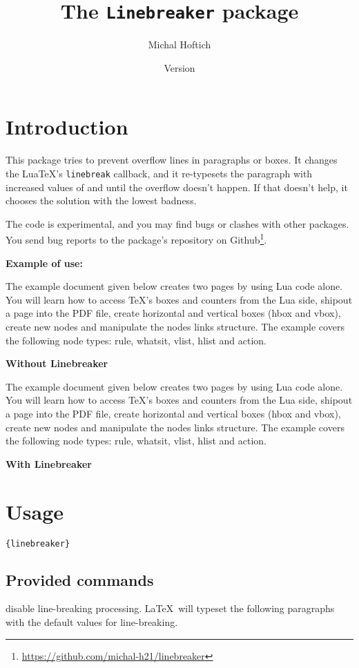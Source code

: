 \documentclass{l3doc}
\title{The \texttt{Linebreaker} package}
\author{Michal Hoftich\authormail{michal.h21@gmail.com}}
\date{Version \version\\\gitdate}
\newcommand\testbox[1]{%
  \parbox{150pt}{%
    \parindent=15pt%
    \tolerance=1%
    \pretolerance=1%
    #1
  }%
}
\newcommand\printtest[1]{%
  \linebreakerdisable%
  \noindent\testbox{%
    #1
    \par\medskip\noindent \textbf{Without Linebreaker}
  }%
  \linebreakerenable%
  \hfill%
  \testbox{%
    #1
    \par\medskip\noindent \textbf{With Linebreaker}
  }%
}
\begin{document}
\maketitle
\tableofcontents

\section{Introduction}

This package tries to prevent overflow lines in paragraphs or boxes.
It changes the Lua\TeX's \verb|linebreak| callback, and it re-typesets the paragraph 
with increased values of \cmd{\tolerance} and \cmd{\emergencystretch}
until the overflow doesn't happen. If that doesn't help, it chooses the solution
with the lowest badness.

The code is experimental, and you may find bugs or clashes with
other packages. You send bug reports to the package's repository on 
Github\footnote{\url{https://github.com/michal-h21/linebreaker}}.


\bigskip
\noindent\textbf{Example of use:}
\bigskip

 \def\testtext{%
The example document given below creates two pages by using Lua code alone. You
will learn how to access TeX's boxes and counters from the Lua side, shipout a
page into the PDF file, create horizontal and vertical boxes (hbox and vbox),
create new nodes and manipulate the nodes links structure. The example covers
the following node types: rule, whatsit, vlist, hlist and action.
 }



\printtest\testtext%

\section{Usage}

\cmd{\usepackage}\verb|{linebreaker}|

\subsection{Provided commands}

\begin{function}{\linebreakerdisable}
disable line-breaking processing. \LaTeX\ will typeset the following paragraphs with the default values for line-breaking.
\end{function}
\end{document}
